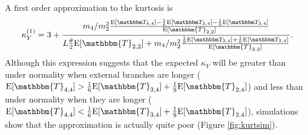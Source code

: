 A first order approximation to the kurtosis is
\begin{equation}
    \label{eq:firstord} 
\kappa_Y^{(1)} = 3 + \frac{m_4/m_2^2 \frac{\CCC}{\E[\mathbbm{T}_{2,2}]}} {L \T \E[\mathbbm{T}_{2,2}]
    + m_4/m_2^2 \frac{\BBB}{\E[\mathbbm{T}_{2,2}]}}.
\end{equation}
Although this expression suggests that the expected $\kappa_Y$ will be greater
than under normality when external branches are longer ($\E[\mathbbm{T}_{4,4}] >
\frac{1}{6}\E[\mathbbm{T}_{3,4}] + \frac{1}{9}\E[\mathbbm{T}_{2,4}]$) and less
than under normality when they are longer ($\E[\mathbbm{T}_{4,4}] <
\frac{1}{6}\E[\mathbbm{T}_{3,4}] + \frac{1}{9}\E[\mathbbm{T}_{2,4}]$),
simulations show that the approximation is actually quite poor (Figure
\ref{fig:kurtsim}).

